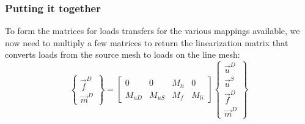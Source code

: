 \documentclass[10pt,letterpaper,oneside,notitlepage]{article}
\begin{document}
\subsubsection{Putting it together}
To form the matrices for loads transfers for the various mappings available, we now need to multiply a few matrices to return the linearization
matrix that converts loads from the source mesh to loads on the line mesh:
\begin{equation}
\label{LinearEqn}
   \left\{   \begin{matrix} \vec{f}^{D} \\ \vec{m}^{D} \end{matrix} \right\} 
=
   \begin{bmatrix}
   0        & 0         & M_{li} & 0   \\
   M_{uD}   & M_{uS}    & M_f    & M_{li}
   \end{bmatrix}
   \left\{   \begin{matrix} \vec{u}^D \\ \vec{u}^S \\ \vec{f}^{D} \\ \vec{m}^{D} \end{matrix} \right\} 
\end{equation}
\end{document}
